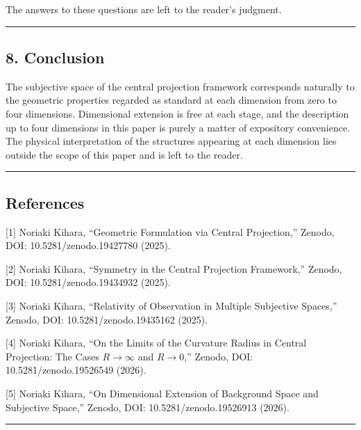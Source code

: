 \documentclass[a4paper,11pt]{article}
\theoremstyle{definition}
\begin{document}
The answers to these questions are left to the reader's judgment.

\begin{center}\rule{0.5\linewidth}{0.5pt}\end{center}

\subsection{8. Conclusion}\label{conclusion}

The subjective space of the central projection framework corresponds naturally to the geometric properties regarded as standard at each dimension from zero to four dimensions. Dimensional extension is free at each stage, and the description up to four dimensions in this paper is purely a matter of expository convenience. The physical interpretation of the structures appearing at each dimension lies outside the scope of this paper and is left to the reader.

\begin{center}\rule{0.5\linewidth}{0.5pt}\end{center}

\subsection{References}\label{references}

{[}1{]} Noriaki Kihara, ``Geometric Formulation via Central Projection,'' Zenodo, DOI: 10.5281/zenodo.19427780 (2025).

{[}2{]} Noriaki Kihara, ``Symmetry in the Central Projection Framework,'' Zenodo, DOI: 10.5281/zenodo.19434932 (2025).

{[}3{]} Noriaki Kihara, ``Relativity of Observation in Multiple Subjective Spaces,'' Zenodo, DOI: 10.5281/zenodo.19435162 (2025).

{[}4{]} Noriaki Kihara, ``On the Limits of the Curvature Radius in Central Projection: The Cases \(R \to \infty\) and \(R \to 0\),'' Zenodo, DOI: 10.5281/zenodo.19526549 (2026).

{[}5{]} Noriaki Kihara, ``On Dimensional Extension of Background Space and Subjective Space,'' Zenodo, DOI: 10.5281/zenodo.19526913 (2026).

\begin{center}\rule{0.5\linewidth}{0.5pt}\end{center}
\end{document}
